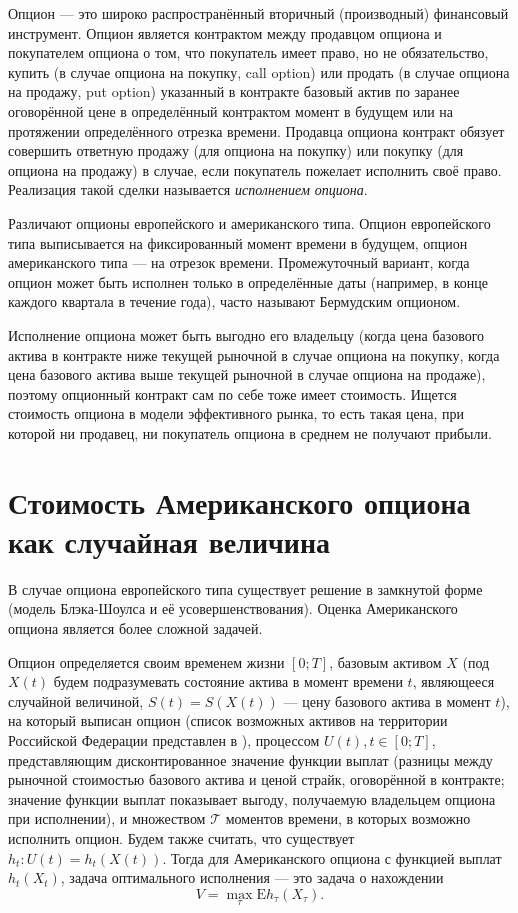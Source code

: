 \documentclass[specialist,
               substylefile = ../spbu.rtx,
               subf,href,colorlinks=true, 10pt]{disser}
\newcommand{\E}{\mathrm{E}}
\newcommand{\Tau}{\ensuremath{\mathcal{T}}}
\begin{document}
Опцион --- это широко распространённый вторичный (производный) финансовый инструмент. Опцион является контрактом между продавцом опциона и покупателем опциона о том, что покупатель имеет право, но не обязательство, купить (в случае опциона на покупку, call option) или продать (в случае опциона на продажу, put option) указанный в контракте базовый актив по заранее оговорённой цене в определённый контрактом момент в будущем или на протяжении определённого отрезка времени. Продавца опциона контракт обязует совершить ответную продажу (для опциона на покупку) или покупку (для опциона на продажу) в случае, если покупатель пожелает исполнить своё право. Реализация такой сделки называется \emph{исполнением опциона}.

Различают опционы европейского и американского типа. Опцион европейского типа выписывается на фиксированный момент времени в будущем, опцион американского типа --- на отрезок времени. Промежуточный вариант, когда опцион может быть исполнен только в определённые даты (например, в конце каждого квартала в течение года), часто называют Бермудским опционом.

Исполнение опциона может быть выгодно его владельцу (когда цена базового актива в контракте ниже текущей рыночной в случае опциона на покупку, когда цена базового актива выше текущей рыночной в случае опциона на продаже), поэтому опционный контракт сам по себе тоже имеет стоимость. Ищется стоимость опциона в модели эффективного рынка, то есть такая цена, при которой ни продавец, ни покупатель опциона в среднем не получают прибыли.

\section{Стоимость Американского опциона как случайная величина} %
\label{sec:option_price}

В случае опциона европейского типа существует решение в замкнутой форме (модель Блэка-Шоулса \cite{Black1973} и её усовершенствования). Оценка Американского опциона является более сложной задачей.

Опцион определяется своим временем жизни $[0;T]$, базовым активом $X$ (под $X(t)$ будем подразумевать состояние актива в момент времени $t$, являющееся случайной величиной, $S(t) = S(X(t))$ --- цену базового актива в момент $t$), на который выписан опцион (список возможных активов на территории Российской Федерации представлен в \cite{fsfr}), процессом $U(t), t\in [0;T]$, представляющим дисконтированное значение функции выплат (разницы между рыночной стоимостью базового актива и ценой страйк, оговорённой в контракте; значение функции выплат показывает выгоду, получаемую владельцем опциона при исполнении), и множеством $\Tau$ моментов времени, в которых возможно исполнить опцион. Будем также считать, что существует $h_t: U(t) = h_t\left(X(t)\right)$. Тогда для Американского опциона с функцией выплат $h_t\left(X_t\right)$, задача оптимального исполнения --- это задача о нахождении 
\begin{equation}\label{eq:optimal_stopping}
V = \max_{\tau} \E h_\tau\left(X_\tau\right).
\end{equation}
\end{document}
